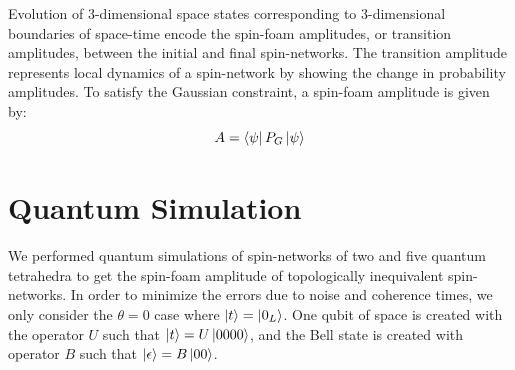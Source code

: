 \documentclass[a4paper,11pt,aps,tightenlines,nofootinbib]{revtex4}
\begin{document}

        Evolution of 3-dimensional space states corresponding to 3-dimensional boundaries of space-time encode the spin-foam amplitudes, or transition amplitudes, between the 
        initial and final spin-networks. The transition amplitude represents local dynamics of a spin-network \cite{ooguri} by showing the change in probability amplitudes. To satisfy 
        the Gaussian constraint, a spin-foam amplitude is given by:
        \begin{equation}
                A = \bra{\psi}P_G\ket{\psi}
        \end{equation}


\section{Quantum Simulation}

        We performed quantum simulations of spin-networks of two and five quantum tetrahedra to get the spin-foam amplitude of topologically inequivalent spin-networks.
        In order to minimize the errors due to noise and coherence times, we only consider the $\theta=0$ case where $\ket{t} = \ket{0_L}$. One qubit of space is created with 
        the operator $U$ such that $\ket{t} = U\ket{0000}$, and the Bell state is created with operator $B$ such that $\ket{\epsilon} = B\ket{00}$.
\end{document}
